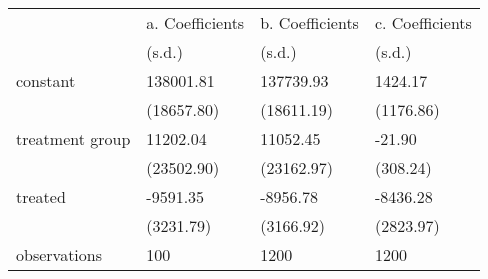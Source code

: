 \begin{tabular}{llll}
\toprule
{} & a. Coefficients & b. Coefficients & c. Coefficients \\
{} &          (s.d.) &          (s.d.) &          (s.d.) \\
\midrule
constant        &       138001.81 &       137739.93 &         1424.17 \\
                &      (18657.80) &      (18611.19) &       (1176.86) \\
treatment group &        11202.04 &        11052.45 &          -21.90 \\
                &      (23502.90) &      (23162.97) &        (308.24) \\
treated         &        -9591.35 &        -8956.78 &        -8436.28 \\
                &       (3231.79) &       (3166.92) &       (2823.97) \\
observations    &             100 &            1200 &            1200 \\
\bottomrule
\end{tabular}

